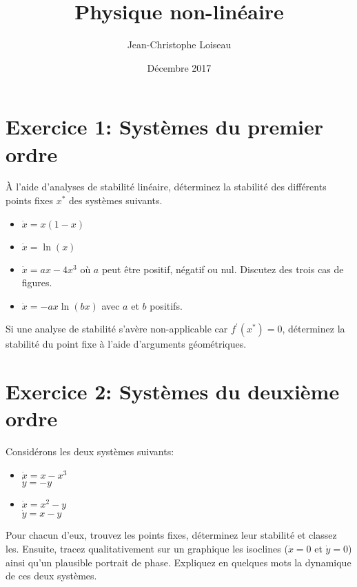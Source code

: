 \documentclass{article}
\title{Physique non-linéaire}
\author{Jean-Christophe Loiseau}
\date{Décembre 2017}
\begin{document}
\maketitle

\section*{Exercice 1: Systèmes du premier ordre}

À l'aide d'analyses de stabilité linéaire, déterminez la stabilité des différents points fixes $x^*$ des systèmes suivants.

\begin{multicols}{2}
    \begin{itemize}
        \item $\dot{x} = x(1-x)$
        \item $\dot{x} = \ln(x)$
        \item $\dot{x} = ax - 4x^3$ où $a$ peut être positif, négatif ou nul. Discutez des trois cas de figures.
        \item $\dot{x} = -ax \ln(bx)$ avec $a$ et $b$ positifs.
    \end{itemize}
\end{multicols}

\noindent Si une analyse de stabilité s'avère non-applicable car $f^{\prime}(x^*)=0$, déterminez la stabilité du point fixe à l'aide d'arguments géométriques.

\section*{Exercice 2: Systèmes du deuxième ordre}

Considérons les deux systèmes suivants:

\begin{multicols}{2}
    \begin{itemize}
        \item $\dot{x} = x - x^3$ \\ $\dot{y} = -y$
        \item $\dot{x} = x^2 -y$ \\ $\dot{y} = x -y$
    \end{itemize}
\end{multicols}

\noindent Pour chacun d'eux, trouvez les points fixes, déterminez leur stabilité et classez les. Ensuite, tracez qualitativement sur un graphique les isoclines ($\dot{x} = 0$ et $\dot{y} = 0$) ainsi qu'un plausible portrait de phase. Expliquez en quelques mots la dynamique de ces deux systèmes.
\end{document}
